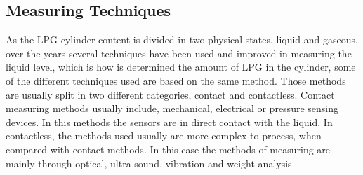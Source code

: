\subsection{Measuring Techniques}
As the LPG cylinder content is divided in two physical states, liquid and gaseous, over the years several techniques have been used and improved in measuring the liquid level, which is how is determined the amount of LPG in the cylinder, some of the different techniques used are based on the same method. Those methods are usually split in two different categories, contact and contactless. Contact measuring methods usually include, mechanical, electrical or pressure sensing devices. In this methods the sensors are in direct contact with the liquid. In contactless, the methods used usually are more complex to process, when compared with contact methods. In this case the methods of measuring are mainly through optical, ultra-sound, vibration and weight analysis~\cite{nakagawaContactlessLiquidLevelMeasurement2013a}. 
